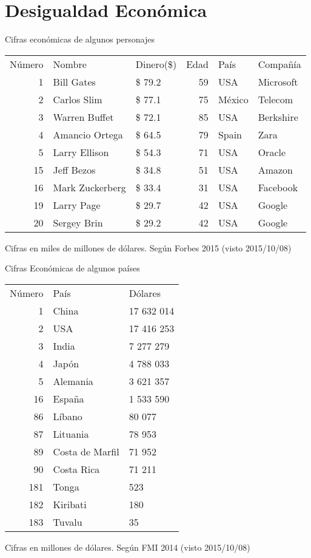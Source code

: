 \documentclass[bigger]{beamer}
\begin{document}
\section{Desigualdad Económica}
\label{sec-3}
\begin{frame}[label=sec-3-1]{Cifras económicas de algunos personajes}
\begin{center}
\begin{tabular}{rllrll}
Número & Nombre & Dinero(\$) & Edad & País & Compañía\\
1 & Bill Gates & \$ 79.2 & 59 & USA & Microsoft\\
2 & Carlos Slim & \$ 77.1 & 75 & México & Telecom\\
3 & Warren Buffet & \$ 72.1 & 85 & USA & Berkshire\\
4 & Amancio Ortega & \$ 64.5 & 79 & Spain & Zara\\
5 & Larry Ellison & \$ 54.3 & 71 & USA & Oracle\\
15 & Jeff Bezos & \$ 34.8 & 51 & USA & Amazon\\
16 & Mark Zuckerberg & \$ 33.4 & 31 & USA & Facebook\\
19 & Larry Page & \$ 29.7 & 42 & USA & Google\\
20 & Sergey Brin & \$ 29.2 & 42 & USA & Google\\
\end{tabular}
\end{center}

Cifras en miles de millones de dólares. Según Forbes 2015 (visto 2015/10/08)
\end{frame}

\begin{frame}[label=sec-3-2]{Cifras Económicas de algunos países}
\begin{center}
\begin{tabular}{rll}
Número & País & Dólares\\
1 & China & 17 632 014\\
2 & USA & 17 416 253\\
3 & India & 7 277 279\\
4 & Japón & 4 788 033\\
5 & Alemania & 3 621 357\\
16 & España & 1 533 590\\
86 & Líbano & 80 077\\
87 & Lituania & 78 953\\
89 & Costa de Marfil & 71 952\\
90 & Costa Rica & 71 211\\
181 & Tonga & 523\\
182 & Kiribati & 180\\
183 & Tuvalu & 35\\
\end{tabular}
\end{center}

Cifras en millones de dólares. Según FMI 2014 (visto 2015/10/08)
\end{frame}
\end{document}
